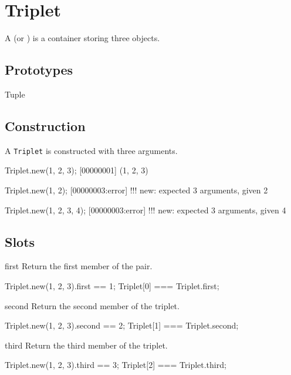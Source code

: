 
\section{Triplet}

A  (or ) is a container storing three
objects.


\subsection{Prototypes}
\begin{refObjects}
\item[Tuple]
\end{refObjects}

\subsection{Construction}

A \lstinline|Triplet| is constructed with three arguments.

\begin{urbiscript}[firstnumber=1]
Triplet.new(1, 2, 3);
[00000001] (1, 2, 3)

Triplet.new(1, 2);
[00000003:error] !!! new: expected 3 arguments, given 2

Triplet.new(1, 2, 3, 4);
[00000003:error] !!! new: expected 3 arguments, given 4
\end{urbiscript}

\subsection{Slots}
\begin{urbiscriptapi}
\item[first]
  Return the first member of the pair.
\begin{urbiassert}
Triplet.new(1, 2, 3).first == 1;
Triplet[0] === Triplet.first;
\end{urbiassert}

\item[second]
  Return the second member of the triplet.
\begin{urbiassert}
Triplet.new(1, 2, 3).second == 2;
Triplet[1] === Triplet.second;
\end{urbiassert}

\item[third]
  Return the third member of the triplet.
\begin{urbiassert}
Triplet.new(1, 2, 3).third == 3;
Triplet[2] === Triplet.third;
\end{urbiassert}
\end{urbiscriptapi}



